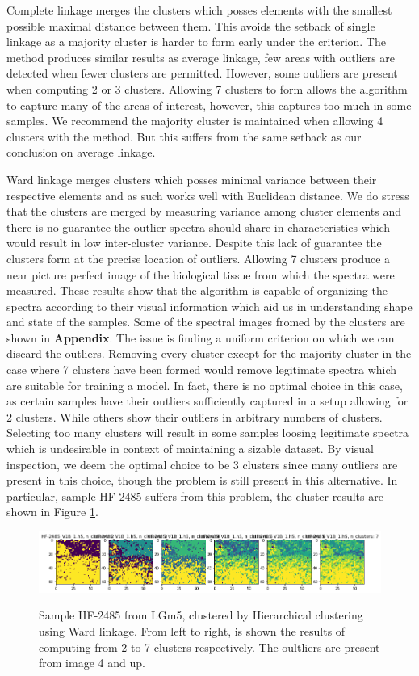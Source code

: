 Complete linkage merges the clusters which posses elements with the smallest possible maximal distance between them. This avoids the setback of single linkage as a majority cluster is harder to form early under the criterion. The method produces similar results as average linkage, few areas with outliers are detected when fewer clusters are permitted. However, some outliers are present when computing 2 or 3 clusters. Allowing 7 clusters to form allows the algorithm to capture many of the areas of interest, however, this captures too much in some samples. We recommend the majority cluster is maintained when allowing 4 clusters with the method. But this suffers from the same setback as our conclusion on average linkage.

Ward linkage merges clusters which posses minimal variance between their respective elements and as such works well with Euclidean distance. We do stress that the clusters are merged by measuring variance among cluster elements and there is no guarantee the outlier spectra should share in characteristics which would result in low inter-cluster variance. Despite this lack of guarantee the clusters form at the precise location of outliers. Allowing 7 clusters produce a near picture perfect image of the biological tissue from which the spectra were measured. These results show that the algorithm is capable of organizing the spectra according to their visual information which aid us in understanding shape and state of the samples. Some of the spectral images fromed by the clusters are shown in \textbf{Appendix}. The issue is finding a uniform criterion on which we can discard the outliers. Removing every cluster except for the majority cluster in the case where 7 clusters have been formed would remove legitimate spectra which are suitable for training a model. In fact, there is no optimal choice in this case, as certain samples have their outliers sufficiently captured in a setup allowing for 2 clusters. While others show their outliers in arbitrary numbers of clusters. Selecting too many clusters will result in some samples loosing legitimate spectra which is undesirable in context of maintaining a sizable dataset. By visual inspection, we deem the optimal choice to be 3 clusters since many outliers are present in this choice, though the problem is still present in this alternative. In particular, sample HF-2485 suffers from this problem, the cluster results are shown in Figure \ref{fig:hf_2485}.

\begin{figure}[h]
\label{fig:hf_2485}
    \centering
{\includegraphics[width=15cm]{images/Ward_linkage/LGm-5/HF-2485_V1B_1.h5_9.png} }
\caption{Sample HF-2485 from LGm5, clustered by Hierarchical clustering using Ward linkage. From left to right, is shown the results of computing from 2 to 7 clusters respectively. The oultliers are present from image 4 and up.}%
\end{figure}

